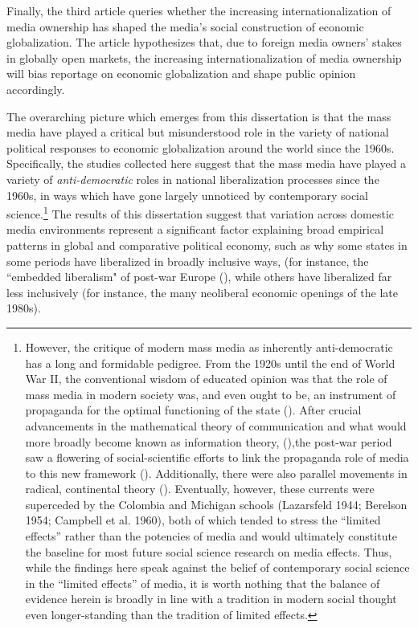 \documentclass[12pt]{report}
\begin{document}
Finally, the third article queries whether the increasing internationalization of media ownership has shaped the media's social construction of economic globalization. The article hypothesizes that, due to foreign media owners' stakes in globally open markets, the increasing internationalization of media ownership will bias reportage on economic globalization and shape public opinion accordingly.

The overarching picture which emerges from this dissertation is that the mass media have played a critical but
misunderstood role in the variety of national political responses to economic globalization around
the world since the 1960s. Specifically, the studies collected here suggest that the mass media have
played a variety of \emph{anti-democratic} roles in national liberalization processes since the
1960s, in ways which have gone largely unnoticed by contemporary social science.\footnote{However, the critique of modern mass media as inherently anti-democratic has a long and formidable pedigree. From the 1920s until the end of World War II, the conventional wisdom of educated opinion was that the role of mass media in modern society was, and even ought to be, an instrument of propaganda for the optimal functioning of the state (\citealt{Bernays:2004vo, lippmann1932public}). After crucial advancements in the mathematical theory of communication and what would more broadly become known as information theory, (\citealt{Shannon:2013iy,gleick2011information}),the post-war period saw a flowering of social-scientific efforts to link the propaganda role of media to this new framework (\citealt{wiener1965cybernetics, Deutsch:1953ww, Deutsch:1966ux,McLuhan:1994tf,Ellul:1965uf}). Additionally, there were also parallel movements in radical, continental
theory (\citealt{Horkheimer:2009te,adorno2001culture,Debord:1967vn}). Eventually, however, these currents were superceded by the Colombia and Michigan schools (Lazarsfeld 1944; Berelson 1954; Campbell et al. 1960), both of which tended to stress the ``limited effects'' rather than the potencies of media and would ultimately constitute the baseline for most future social science research on media effects. Thus, while the findings here speak against the belief of contemporary social science in the ``limited effects'' of media, it is worth nothing that the balance of evidence herein is broadly in line with a tradition in modern social thought even longer-standing than the tradition of limited effects.} The results of this dissertation suggest that variation across domestic media environments represent a significant factor explaining broad
empirical patterns in global and comparative political economy, such as why some states in some
periods have liberalized in broadly inclusive ways, (for instance, the ``embedded liberalism" of
post-war Europe (\citealt{Ruggie:1982wx}), while others have liberalized far less inclusively (for
instance, the many neoliberal economic openings of the late 1980s).
\end{document}
